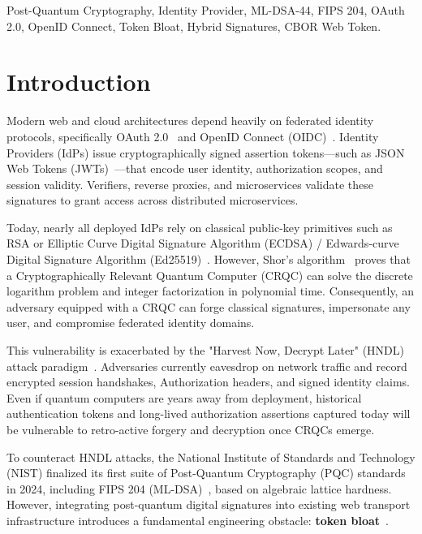 \documentclass{article}
\begin{document}
\begin{IEEEkeywords}
Post-Quantum Cryptography, Identity Provider, ML-DSA-44, FIPS 204, OAuth 2.0, OpenID Connect, Token Bloat, Hybrid Signatures, CBOR Web Token.

\section{Introduction}
Modern web and cloud architectures depend heavily on federated identity protocols, specifically OAuth 2.0~\cite{rfc6749} and OpenID Connect (OIDC)~\cite{oidc_core}. Identity Providers (IdPs) issue cryptographically signed assertion tokens---such as JSON Web Tokens (JWTs)~\cite{rfc7519}---that encode user identity, authorization scopes, and session validity. Verifiers, reverse proxies, and microservices validate these signatures to grant access across distributed microservices.

Today, nearly all deployed IdPs rely on classical public-key primitives such as RSA or Elliptic Curve Digital Signature Algorithm (ECDSA) / Edwards-curve Digital Signature Algorithm (Ed25519)~\cite{rfc8032}. However, Shor's algorithm~\cite{shor1994} proves that a Cryptographically Relevant Quantum Computer (CRQC) can solve the discrete logarithm problem and integer factorization in polynomial time. Consequently, an adversary equipped with a CRQC can forge classical signatures, impersonate any user, and compromise federated identity domains.

This vulnerability is exacerbated by the "Harvest Now, Decrypt Later" (HNDL) attack paradigm~\cite{mosca2018}. Adversaries currently eavesdrop on network traffic and record encrypted session handshakes, Authorization headers, and signed identity claims. Even if quantum computers are years away from deployment, historical authentication tokens and long-lived authorization assertions captured today will be vulnerable to retro-active forgery and decryption once CRQCs emerge.

To counteract HNDL attacks, the National Institute of Standards and Technology (NIST) finalized its first suite of Post-Quantum Cryptography (PQC) standards in 2024, including FIPS 204 (ML-DSA)~\cite{fips204}, based on algebraic lattice hardness. However, integrating post-quantum digital signatures into existing web transport infrastructure introduces a fundamental engineering obstacle: \textbf{token bloat}~\cite{kampanakis2022, paquin2023}.


\end{IEEEkeywords}
\end{document}
